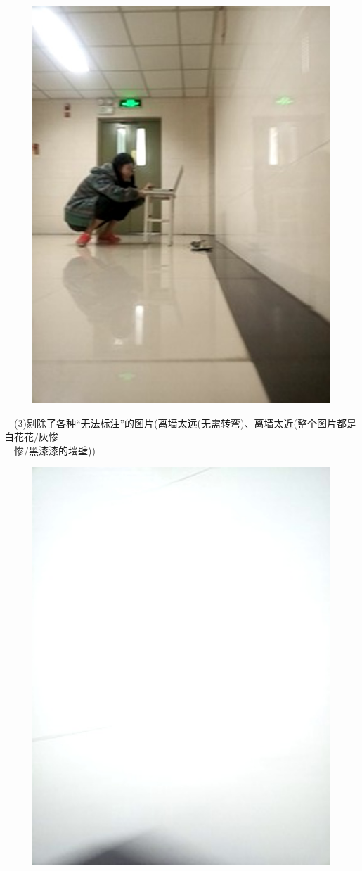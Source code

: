 \documentclass[19pt,a4paper]{article}
\begin{document}
\begin{figure}[H]
 \centering
 \includegraphics[scale=0.4]{5.png}
\end{figure}
\indent\ \ (3)剔除了各种“无法标注”的图片(离墙太远(无需转弯)、离墙太近(整个图片都是白花花/灰惨\\
\indent\ \ 惨/黑漆漆的墙壁))\\
\begin{figure}[H]
 \centering
 \includegraphics[scale=0.4]{6.png}
\end{figure}
\end{document}
